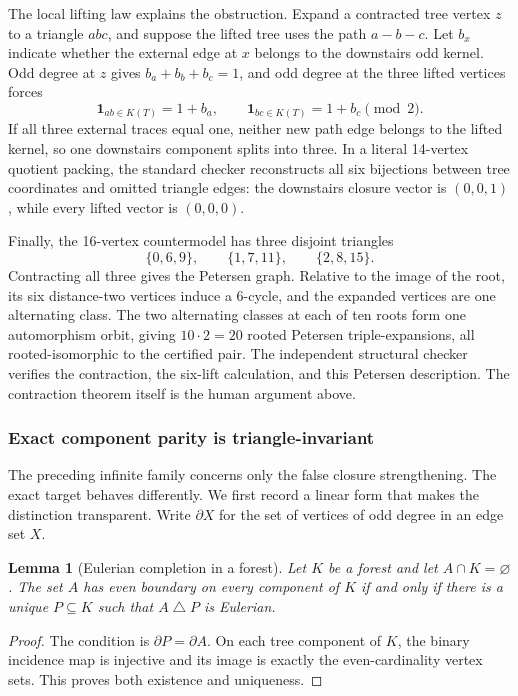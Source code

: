 \documentclass[11pt]{article}
\newtheorem{lemma}[theorem]{Lemma}
\theoremstyle{definition}
\theoremstyle{remark}
\newcommand{\symdiff}{\mathbin{\triangle}}
\newcommand{\1}{\mathbf 1}
\begin{document}
The local lifting law explains the obstruction.  Expand a contracted
tree vertex \(z\) to a triangle \(abc\), and suppose the lifted tree uses
the path \(a-b-c\).  Let \(b_x\) indicate whether the external edge at
\(x\) belongs to the downstairs odd kernel.  Odd degree at \(z\) gives
\(b_a+b_b+b_c=1\), and odd degree at the three lifted vertices forces
\[
 \1_{ab\in K(T)}=1+b_a,\qquad
 \1_{bc\in K(T)}=1+b_c \pmod2.                           \tag{6.16}
\]
If all three external traces equal one, neither new path edge belongs to
the lifted kernel, so one downstairs component splits into three.  In a
literal 14-vertex quotient packing, the standard checker reconstructs all
six bijections between tree coordinates and omitted triangle edges: the
downstairs closure vector is \((0,0,1)\), while every lifted vector is
\((0,0,0)\).

Finally, the 16-vertex countermodel has three disjoint triangles
\[
 \{0,6,9\},\qquad\{1,7,11\},\qquad\{2,8,15\}.
\]
Contracting all three gives the Petersen graph.  Relative to the image of
the root, its six distance-two vertices induce a 6-cycle, and the expanded
vertices are one alternating class.  The two alternating classes at each
of ten roots form one automorphism orbit, giving \(10\cdot2=20\) rooted
Petersen triple-expansions, all rooted-isomorphic to the certified pair.
The independent structural checker verifies the contraction, the
six-lift calculation, and this Petersen description.  The contraction
theorem itself is the human argument above.

\subsubsection*{Exact component parity is triangle-invariant}

The preceding infinite family concerns only the false closure
strengthening.  The exact target behaves differently.  We first record a
linear form that makes the distinction transparent.  Write
\(\partial X\) for the set of vertices of odd degree in an edge set \(X\).

\begin{lemma}[Eulerian completion in a forest]\label{lem:forest-completion}
Let \(K\) be a forest and let \(A\cap K=\varnothing\).  The set \(A\) has
even boundary on every component of \(K\) if and only if there is a unique
\(P\subseteq K\) such that \(A\symdiff P\) is Eulerian.
\end{lemma}

\begin{proof}
The condition is \(\partial P=\partial A\).  On each tree component of
\(K\), the binary incidence map is injective and its image is exactly the
even-cardinality vertex sets.  This proves both existence and uniqueness.
\end{proof}
\end{document}
